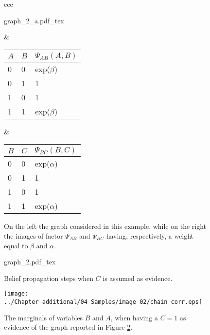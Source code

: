 \begin{figure}
\begin{tabular}{ccc}
\begin{minipage}[t]{0.25 \columnwidth}
	\centering
\def\svgwidth{0.9 \textwidth}
{graph_2_a.pdf_tex} 
\end{minipage} 
 & 
\begin{minipage}[t]{0.3 \columnwidth}
\begin{tabular}{|l|l|l|}
$A$ & $B$ & $\Psi_{AB}(A,B)$ \\
\hline
0 & 0 & exp($\beta$) \\
\hline
0 & 1 & 1 \\
\hline
1 & 0 & 1 \\
\hline
1 & 1 & exp($\beta$) \\
\hline
\end{tabular}
\end{minipage} 
 & 
\begin{minipage}[t]{0.3 \columnwidth}
\begin{tabular}{|l|l|l|}
$B$ & $C$ & $\Psi_{BC}(B,C)$ \\
\hline
0 & 0 & exp($\alpha$) \\
\hline
0 & 1 & 1 \\
\hline
1 & 0 & 1 \\
\hline
1 & 1 & exp($\alpha$) \\
\hline
\end{tabular}
\end{minipage} 
\end{tabular}
\caption{On the left the graph considered in this example, while on the right the images of factor $\Psi_{AB}$ and $\Psi_{BC}$ having, respectively, a weight equal to $\beta$  and $\alpha$. }
\label{fig:sample_02:1}
\end{figure}

\begin{figure}
	\centering
\def\svgwidth{0.65 \textwidth}
{graph_2.pdf_tex} 
\caption{Belief propagation steps when $C$ is assumed as evidence.}
\label{fig:sample_02:2}
\end{figure}

\begin{figure}
	\centering
\texttt{[image: ../Chapter\_additional/04\_Samples/image\_02/chain\_corr.eps]}
\caption{The marginals of variables $B$ and $A$, when having a $C=1$ as evidence of the graph reported in Figure \ref{fig:sample_02:2}.}
\label{fig:sample_02:3}
\end{figure} 

